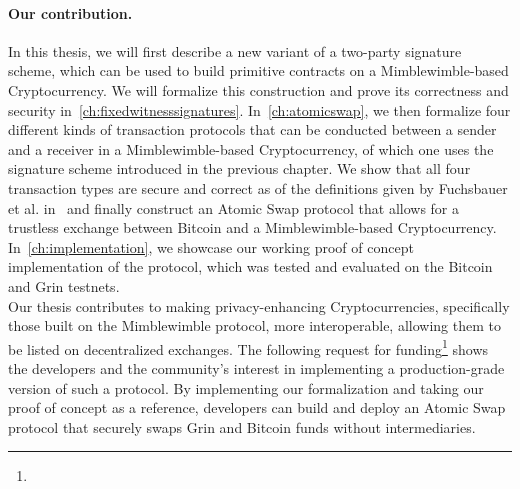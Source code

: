 \paragraph{Our contribution.} In this thesis, we will first describe a new variant of a two-party signature scheme, which can be used to build primitive contracts on a Mimblewimble-based Cryptocurrency.
We will formalize this construction and prove its correctness and security in~\cref{ch:fixedwitnesssignatures}.
In~\cref{ch:atomicswap}, we then formalize four different kinds of transaction protocols that can be conducted between a sender and a receiver in a Mimblewimble-based Cryptocurrency, of which one uses the signature scheme introduced in the previous chapter.
We show that all four transaction types are secure and correct as of the definitions given by Fuchsbauer et al. in~\cite{fuchsbauer2019aggregate} and finally construct an Atomic Swap protocol that allows for a trustless exchange between Bitcoin and a Mimblewimble-based Cryptocurrency.
In~\cref{ch:implementation}, we showcase our working proof of concept implementation of the protocol, which was tested and evaluated on the Bitcoin and Grin testnets.\\
Our thesis contributes to making privacy-enhancing Cryptocurrencies, specifically those built on the Mimblewimble protocol, more interoperable, allowing them to be listed on decentralized exchanges.
The following request for funding\footnote{\urlgrinfund} shows the developers and the community's interest in implementing a production-grade version of such a protocol.
By implementing our formalization and taking our proof of concept as a reference, developers can build and deploy an Atomic Swap protocol that securely swaps Grin and Bitcoin funds without intermediaries.

